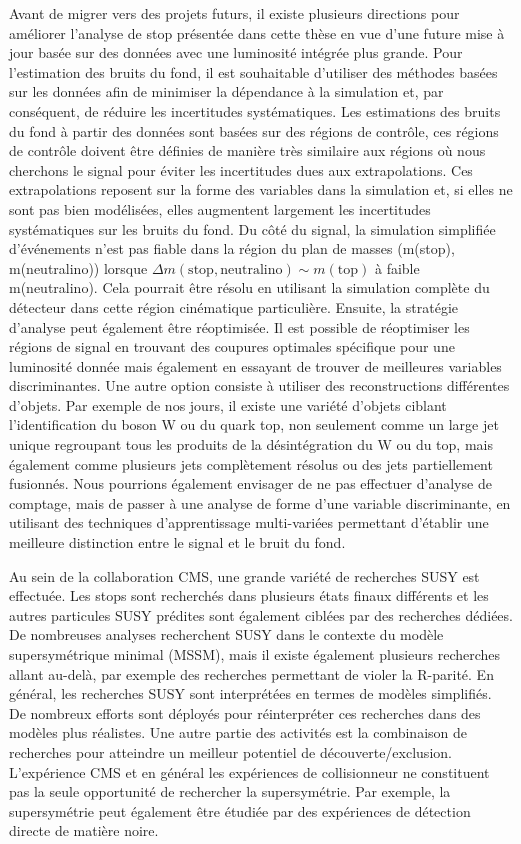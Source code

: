 Avant de migrer vers des projets futurs, il existe plusieurs directions pour améliorer l'analyse de stop présentée dans cette thèse en vue d'une future mise à jour basée sur des données avec une luminosité intégrée plus grande. Pour l'estimation des bruits du fond, il est souhaitable d'utiliser des méthodes basées sur les données afin de minimiser la dépendance à la simulation et, par conséquent, de réduire les incertitudes systématiques. Les estimations des bruits du fond  à partir des  données sont basées sur des régions de contrôle, ces régions de contrôle doivent être définies de manière très similaire aux régions où nous cherchons le signal pour éviter les incertitudes dues aux extrapolations. Ces extrapolations reposent sur la forme des variables dans la simulation et, si elles ne sont pas bien modélisées, elles augmentent largement les incertitudes systématiques sur les bruits du fond. Du côté du signal, la simulation simplifiée d'événements n'est pas fiable dans la région du plan de masses  (m(stop), m(neutralino)) lorsque  $ \Delta m (\mathrm{stop, neutralino}) \sim m(\mathrm{top}) $ à faible m(neutralino). Cela pourrait être résolu en utilisant la simulation complète du détecteur dans cette région cinématique particulière. Ensuite, la stratégie d'analyse peut également être réoptimisée. Il est possible de réoptimiser les régions de signal en trouvant des coupures optimales spécifique pour une luminosité donnée mais également en essayant  de trouver de meilleures variables discriminantes. Une autre option consiste à utiliser des reconstructions différentes d'objets. Par exemple de nos jours, il existe une variété d'objets ciblant l'identification du boson W ou du quark top, non seulement comme un large jet unique regroupant tous les produits de la désintégration du W ou du top, mais également comme plusieurs jets complètement résolus ou des jets partiellement fusionnés. Nous pourrions également envisager de ne pas effectuer d’analyse de comptage, mais de passer à une analyse de forme d'une variable discriminante, en utilisant des techniques d’apprentissage multi-variées permettant d’établir une meilleure distinction entre le signal et le bruit du fond.


Au sein de la collaboration CMS, une grande variété de recherches SUSY est effectuée. Les stops sont recherchés dans plusieurs états finaux différents et les autres particules SUSY prédites sont également ciblées par des recherches dédiées. De nombreuses analyses recherchent SUSY dans le contexte du modèle supersymétrique minimal (MSSM), mais il existe également plusieurs recherches allant au-delà, par exemple des recherches permettant de violer la R-parité. En général, les recherches SUSY sont interprétées en termes de modèles simplifiés. De nombreux efforts sont déployés pour réinterpréter ces recherches dans des modèles plus réalistes. Une autre partie des activités est la combinaison de recherches pour atteindre un meilleur potentiel de découverte/exclusion. L'expérience CMS et en général les expériences de collisionneur ne constituent pas la seule opportunité de rechercher la supersymétrie. Par exemple, la supersymétrie peut également être étudiée par des expériences de détection directe de matière noire.


